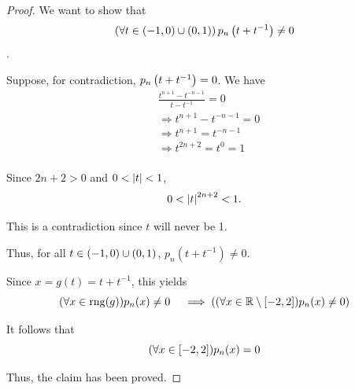 \begin{proof}
    We want to show that $$\left(\forall t \in \left(-1, 0\right) \cup \left(0, 1\right)\right)p_n\left(t + t^{-1}\right) \neq 0$$. 

    Suppose, for contradiction, $p_n\left(t + t^{-1}\right) = 0$. We have 
    \begin{align*}
        &\frac{t^{n + 1} - t^{-n - 1}}{t - t^{-1}} = 0 \\
        &\Rightarrow t^{n + 1} - t^{-n - 1} = 0 \\
        &\Rightarrow t^{n + 1} = t^{-n - 1} \\
        &\Rightarrow t^{2n + 2} = t^0 = 1 \\
    \end{align*}

    Since $2n + 2 > 0$ and $0 < \left|t \right| < 1$, 
    \begin{equation*}
        0 < \left|t \right|^{2n + 2} < 1. 
    \end{equation*}

    This is a contradiction since $t$ will never be 1. 

    Thus, for all $t \in \left(-1, 0\right) \cup \left(0, 1\right)$, $p_n(t + t^{-1}) \neq 0$. 

    Since $x = g(t) = t + t^{-1}$, this yields 
    \begin{equation*}
        (\forall x \in \operatorname{rng }(g))p_n(x) \neq 0 \quad \implies ((\forall x \in \mathbb{R} \setminus \left[-2, 2\right])p_n(x) \neq 0 )
    \end{equation*} 

    It follows that 
    $$
        (\forall x \in \left[-2, 2\right])p_n(x) = 0 
    $$

    Thus, the claim has been proved. 
\end{proof}
